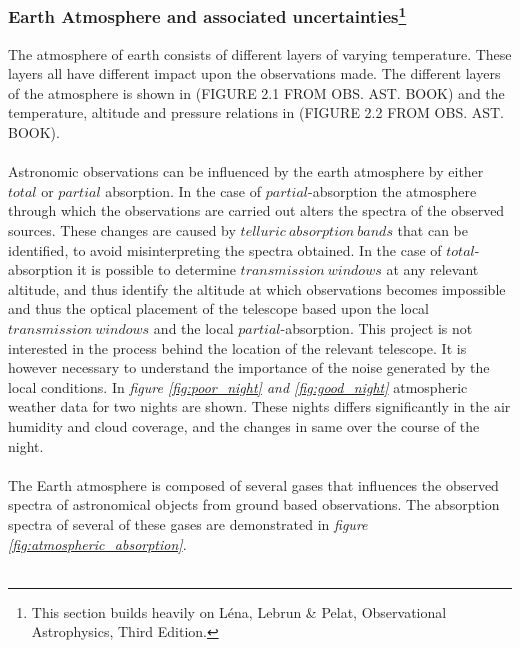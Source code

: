 \documentclass[a4paper, 12pt, twoside]{article}
\begin{document}
\subsubsection[Earth Atmosphere and associated uncertainties]{Earth Atmosphere and associated uncertainties\footnote{This section builds heavily on Léna, Lebrun \& Pelat, Observational Astrophysics, Third Edition.}}
The atmosphere of earth consists of different layers of varying temperature. These layers all have different impact upon the observations made. The different layers of the atmosphere is shown in (FIGURE 2.1 FROM OBS. AST. BOOK) and the temperature, altitude and pressure relations in (FIGURE 2.2 FROM OBS. AST. BOOK).\\
\\
Astronomic observations can be influenced by the earth atmosphere by either $total$ or $partial$ absorption. In the case of $partial$-absorption the atmosphere through which the observations are carried out alters the spectra of the observed sources. These changes are caused by $telluric\ absorption\ bands$ that can be identified, to avoid misinterpreting the spectra obtained. In the case of $total$-absorption it is possible to determine $transmission\ windows$ at any relevant altitude, and thus identify the altitude at which observations becomes impossible and thus the optical placement of the telescope based upon the local $transmission\ windows$ and the local $partial$-absorption. This project is not interested in the process behind the location of the relevant telescope. It is however necessary to understand the importance of the noise generated by the local conditions. In \emph{figure \ref{fig:poor_night} and \ref{fig:good_night}} atmospheric weather data for two nights are shown. These nights differs significantly in the air humidity and cloud coverage, and the changes in same over the course of the night. \\
\\
The Earth atmosphere is composed of several gases that influences the observed spectra of astronomical objects from ground based observations. The absorption spectra of several of these gases are demonstrated in \emph{figure \ref{fig:atmospheric_absorption}}.\\
\\
\end{document}
